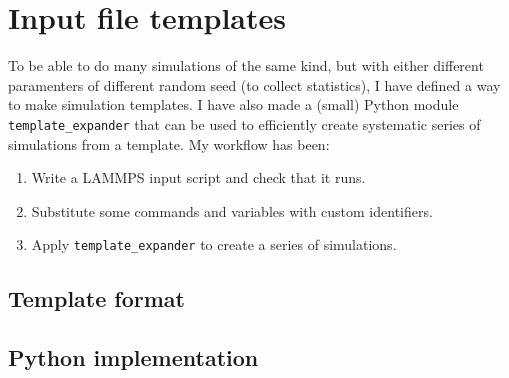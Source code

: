 \chapter{Input file templates}
\label{ch:templates}
To be able to do many simulations of the same kind, but with either different paramenters of different random seed (to collect statistics), I have defined a way to make simulation templates. I have also made a (small) Python module {\tt template\_expander} that can be used to efficiently create systematic series of simulations from a template. My workflow has been: 

\begin{enumerate}
\item Write a LAMMPS input script and check that it runs.
\item Substitute some commands and variables with custom identifiers.
\item Apply {\tt template\_expander} to create a series of simulations.
\end{enumerate}

\section{Template format}

\section{Python implementation}
